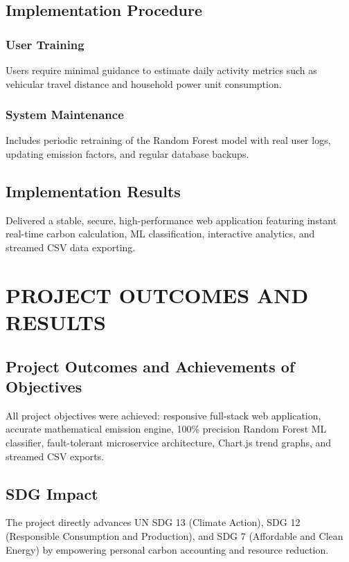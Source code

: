 \documentclass[12pt,a4paper]{report}
\begin{document}
\section{Implementation Procedure}
\subsection{User Training}
Users require minimal guidance to estimate daily activity metrics such as vehicular travel distance and household power unit consumption.

\subsection{System Maintenance}
Includes periodic retraining of the Random Forest model with real user logs, updating emission factors, and regular database backups.

\section{Implementation Results}
Delivered a stable, secure, high-performance web application featuring instant real-time carbon calculation, ML classification, interactive analytics, and streamed CSV data exporting.

\chapter{PROJECT OUTCOMES AND RESULTS}

\section{Project Outcomes and Achievements of Objectives}
All project objectives were achieved: responsive full-stack web application, accurate mathematical emission engine, 100\% precision Random Forest ML classifier, fault-tolerant microservice architecture, Chart.js trend graphs, and streamed CSV exports.

\section{SDG Impact}
The project directly advances UN SDG 13 (Climate Action), SDG 12 (Responsible Consumption and Production), and SDG 7 (Affordable and Clean Energy) by empowering personal carbon accounting and resource reduction.
\end{document}
